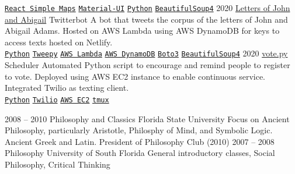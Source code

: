 \documentclass[9pt]{developercv} %
\begin{document}
\begin{entrylist}
{        \texttt{{\href{https://www.react-simple-maps.io/}{React Simple Maps}}}\slashsep
        \texttt{{\href{https://material-ui.com/}{Material-UI}}}\slashsep
        \texttt{{\href{https://www.python.org/}{Python}}}\slashsep
        \texttt{{\href{https://www.crummy.com/software/BeautifulSoup/}{BeautifulSoup4}}}
        }
	\entry
		{2020}
        {{\href{https://twitter.com/john_and_abbie}{Letters of John and Abigail}}}
		{Twitterbot}
        {
            A bot that tweets the corpus of the letters of John and Abigail
            Adams. Hosted on AWS Lambda using AWS DynamoDB for keys to access
            texts hosted on Netlify.
        \\
        \texttt{{\href{https://www.python.org/}{Python}}}\slashsep
        \texttt{{\href{https://www.tweepy.org/}{Tweepy}}}\slashsep
        \texttt{{\href{https://aws.amazon.com/lambda/}{AWS Lambda}}}\slashsep
        \texttt{{\href{https://aws.amazon.com/dynamodb/}{AWS DynamoDB}}}\slashsep
        \texttt{{\href{https://boto3.amazonaws.com/v1/documentation/api/latest/index.html}{Boto3}}}\slashsep
        \texttt{{\href{https://www.crummy.com/software/BeautifulSoup/}{BeautifulSoup4}}}
        }
	\entry
		{2020}
        {\href{https://github.com/malan88/vote}{vote.py}}
		{Scheduler}
        {
            Automated Python script to encourage and remind people to register
            to vote. Deployed using AWS EC2 instance to enable continuous
            service. Integrated Twilio as texting client.
        \\
        \texttt{{\href{https://www.python.org/}{Python}}}\slashsep
        \texttt{{\href{https://www.twilio.com/}{Twilio}}}\slashsep
        \texttt{{\href{https://aws.amazon.com/ec2/}{AWS EC2}}}\slashsep
        \texttt{{\href{https://github.com/tmux/tmux}{tmux}}}
        }
\end{entrylist}



\begin{entrylist}
	\entry
		{2008 -- 2010}
		{Philosophy and Classics}
		{Florida State University}
        {Focus on Ancient Philosophy, particularly Aristotle, Philosphy of Mind,
        and Symbolic Logic. Ancient Greek and Latin. President of Philosophy
        Club (2010)}
	\entry
		{2007 -- 2008}
		{Philosophy}
		{University of South Florida}
        {General introductory classes, Social Philosophy, Critical Thinking}
\end{entrylist}
\end{document}
